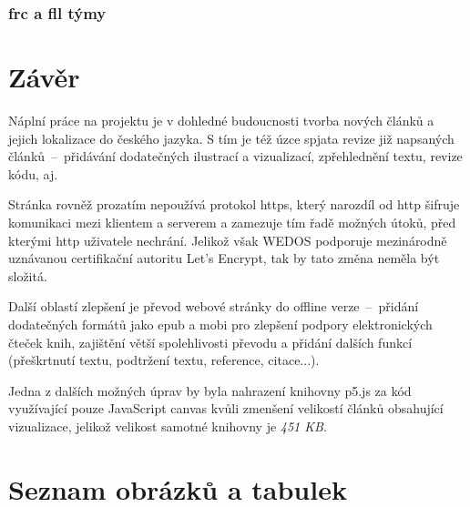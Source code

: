 \documentclass[a4paper, 12pt]{article}
\makeatletter
\renewcommand\listoffigures{%
    \@mkboth{\MakeUppercase\listfigurename}%
        {\MakeUppercase\listfigurename}%
    \@starttoc{lof}%
}
\renewcommand\listoftables{%
    \@mkboth{\MakeUppercase\listtablename}%
        {\MakeUppercase\listtablename}%
    \@starttoc{lot}%
}
\makeatother
\begin{document}
  \subsubsection{\acrshort{frc} a \acrshort{fll} týmy}

  \newpage

  \section{Závěr}
  Náplní práce na projektu je v dohledné budoucnosti tvorba nových článků a jejich lokalizace do českého jazyka. S tím je též úzce spjata revize již napsaných článků~--~přidávání dodatečných ilustrací a vizualizací, zpřehlednění textu, revize kódu, aj.

  Stránka rovněž prozatím nepoužívá protokol \gls{https}, který narozdíl od \gls{http} šifruje komunikaci mezi klientem a serverem a zamezuje tím řadě možných útoků, před kterými \gls{http} uživatele nechrání. Jelikož však WEDOS podporuje mezinárodně uznávanou certifikační autoritu Let's Encrypt, tak by tato změna neměla být složitá.

  Další oblastí zlepšení je převod webové stránky do offline verze~--~přidání dodatečných formátů jako \gls{epub} a \gls{mobi} pro zlepšení podpory elektronických čteček knih, zajištění větší spolehlivosti převodu a přidání dalších funkcí (přeškrtnutí textu, podtržení textu, reference, citace...).

  Jedna z dalších možných úprav by byla nahrazení knihovny p5.js za kód využívající pouze JavaScript canvas kvůli zmenšení velikostí článků obsahující vizualizace, jelikož velikost samotné knihovny je \emph{451 KB}.


  \newpage

  \printbibliography[heading=bibnumbered, title=Použitá literatura]

  \newpage

  \section{Seznam obrázků a tabulek}
  {%
  \let\oldnumberline\numberline%
  \renewcommand{\numberline}{\figurename~\oldnumberline}%
  \listoffigures%
  }
  \vspace{\baselineskip}
  {%
  \let\oldnumberline\numberline%
  \renewcommand{\numberline}{\tablename~\oldnumberline}%
  \listoftables%
  }

  \newpage
\end{document}
